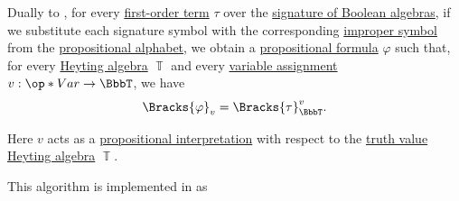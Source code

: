 \begin{algorithm}\label{alg:heyting_term_to_propositional_formula}
  Dually to , for every \hyperref[def:fol_term]{first-order term} \( \tau \) over the \hyperref[def:boolean_algebra/theory]{signature of Boolean algebras}, if we substitute each signature symbol with the corresponding \hyperref[con:improper_symbol]{improper symbol} from the \hyperref[def:propositional_alphabet]{propositional alphabet}, we obtain a \hyperref[def:propositional_formula]{propositional formula} \( \varphi \) such that, for every \hyperref[def:heyting_algebra]{Heyting algebra} \( \BbbT \) and every \hyperref[def:fol_variable_assignment]{variable assignment}  \( v: \op*{Var} \to \BbbT \), we have
  \begin{equation*}
    \Bracks{\varphi}_v = \Bracks{\tau}_\BbbT^v.
  \end{equation*}
\end{algorithm}
\begin{comments}
  \item Here \( v \) acts as a \hyperref[def:propositional_interpretation]{propositional interpretation} with respect to the \hyperref[def:truth_value_algebra]{truth value Heyting algebra} \( \BbbT \).

  \item This algorithm is implemented in \cite{notebook:code} as
  \begin{CodeRefDisplay}
  \end{CodeRefDisplay}
\end{comments}
